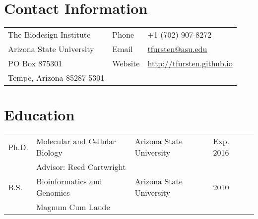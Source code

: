 \documentclass[11pt]{article}
\begin{document}
\section*{Contact Information}
\begin{tabular}[c]{p{3.5in}ll}
The Biodesign Institute& Phone & +1 (702) 907-8272\\
Arizona State University& Email & \href{mailto:tfursten@asu.edu}{tfursten@asu.edu}\\
PO Box 875301 & Website & \href{http://tfursten.github.io}{http://tfursten.github.io}\\
Tempe, Arizona 85287-5301&&\\
\end{tabular}
\section*{Education}
\begin{tabular}[c]{lllll}
Ph.D.& Molecular and Cellular Biology& Arizona State University&Exp. 2016\\
&\multicolumn{3}{l}{Advisor: Reed Cartwright}\\
B.S.&Bioinformatics and Genomics&Arizona State University& 2010\\
&\multicolumn{3}{l}{Magnum Cum Laude}
\end{tabular}
\end{document}
